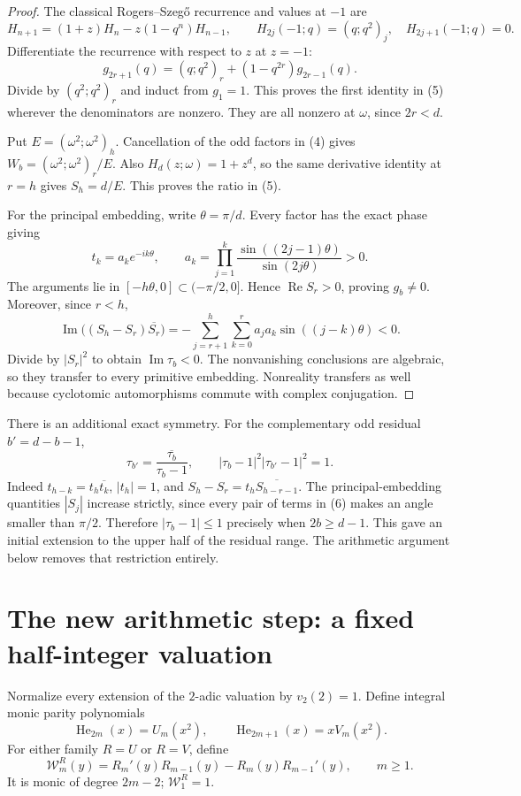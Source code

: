 \documentclass[11pt]{article}
\theoremstyle{remark}\newtheorem{remark}[theorem]{Remark}
\newcommand{\He}{\operatorname{He}}
\newcommand{\poch}[3]{(#1;#2)_{#3}}
\begin{document}
\begin{proof}
The classical Rogers--Szeg\H{o} recurrence and values at $-1$ are
\[
H_{n+1}=(1+z)H_n-z(1-q^n)H_{n-1},\qquad
H_{2j}(-1;q)=\poch{q}{q^2}{j},\quad H_{2j+1}(-1;q)=0.
\]
Differentiate the recurrence with respect to $z$ at $z=-1$:
\[
g_{2r+1}(q)=\poch{q}{q^2}{r}
              +(1-q^{2r})g_{2r-1}(q).
\]
Divide by $\poch{q^2}{q^2}{r}$ and induct from $g_1=1$.
This proves the first identity in (5) wherever the denominators
are nonzero. They are all nonzero at $\omega$, since $2r<d$.

Put $E=\poch{\omega^2}{\omega^2}{h}$. Cancellation of the odd
factors in (4) gives $W_b=\poch{\omega^2}{\omega^2}{r}/E$.
Also $H_d(z;\omega)=1+z^d$, so the same derivative identity at
$r=h$ gives $S_h=d/E$. This proves the ratio in (5).

For the principal embedding, write $\theta=\pi/d$. Every factor
has the exact phase giving
\[
t_k=a_k e^{-ik\theta},\qquad
a_k=\prod_{j=1}^k
\frac{\sin((2j-1)\theta)}{\sin(2j\theta)}>0.
\tag{6}
\]
The arguments lie in $[-h\theta,0]\subset(-\pi/2,0]$.
Hence $\operatorname{Re}S_r>0$, proving $g_b\ne0$.
Moreover, since $r<h$,
\[
\operatorname{Im}\big((S_h-S_r)\overline{S_r}\big)
=-\sum_{j=r+1}^{h}\sum_{k=0}^{r}
a_ja_k\sin((j-k)\theta)<0.
\]
Divide by $|S_r|^2$ to obtain $\operatorname{Im}\tau_b<0$.
The nonvanishing conclusions are algebraic, so they transfer to
every primitive embedding. Nonreality transfers as well because
cyclotomic automorphisms commute with complex conjugation.
\end{proof}

There is an additional exact symmetry. For the complementary odd
residual $b'=d-b-1$,
\[
\tau_{b'}=\overline{\frac{\tau_b}{\tau_b-1}},\qquad
|\tau_b-1|^2|\tau_{b'}-1|^2=1.
\tag{7}
\]
Indeed $t_{h-k}=t_h\overline{t_k}$, $|t_h|=1$, and
$S_h-S_r=t_h\overline{S_{h-r-1}}$. The principal-embedding
quantities $|S_j|$ increase strictly, since every pair of terms in
(6) makes an angle smaller than $\pi/2$. Therefore
$|\tau_b-1|\leq1$ precisely when $2b\geq d-1$. This gave an initial
extension to the upper half of the residual range. The arithmetic
argument below removes that restriction entirely.

\section{The new arithmetic step: a fixed half-integer valuation}

Normalize every extension of the $2$-adic valuation by $v_2(2)=1$.
Define integral monic parity polynomials
\[
\He_{2m}(x)=U_m(x^2),\qquad
\He_{2m+1}(x)=xV_m(x^2).
\]
For either family $R=U$ or $R=V$, define
\[
\mathcal W_m^R(y)
=R_m'(y)R_{m-1}(y)-R_m(y)R_{m-1}'(y),
\qquad m\geq1.
\]
It is monic of degree $2m-2$; $\mathcal W_1^R=1$.
\end{document}
